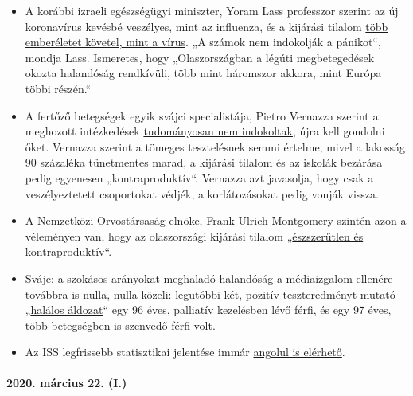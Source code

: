 \begin{itemize}
\tightlist
\item
  A korábbi izraeli egészségügyi miniszter, Yoram Lass professzor
  szerint az új koronavírus kevésbé veszélyes, mint az influenza, és a
  kijárási tilalom
  \href{https://en.globes.co.il/en/article-lockdown-lunacy-1001322696}{több
  emberéletet követel, mint a vírus}. „A számok nem indokolják a
  pánikot``, mondja Lass. Ismeretes, hogy „Olaszországban a légúti
  megbetegedések okozta halandóság rendkívüli, több mint háromszor
  akkora, mint Európa többi részén.``
\item
  A fertőző betegségek egyik svájci specialistája, Pietro Vernazza
  szerint a meghozott intézkedések
  \href{https://www.tagblatt.ch/leben/ostschweizer-infektiologe-pietro-vernazza-die-zahlen-zu-den-jungen-corona-virus-erkrankten-sind-irrefuehrend-ld.1206440}{tudományosan
  nem indokoltak}, újra kell gondolni őket. Vernazza szerint a tömeges
  tesztelésnek semmi értelme, mivel a lakosság 90 százaléka tünetmentes
  marad, a kijárási tilalom és az iskolák bezárása pedig egyenesen
  „kontraproduktív``. Vernazza azt javasolja, hogy csak a
  veszélyeztetett csoportokat védjék, a korlátozásokat pedig vonják
  vissza.
\item
  A Nemzetközi Orvostársaság elnöke, Frank Ulrich Montgomery szintén
  azon a véleményen van, hogy az olaszországi kijárási tilalom
  „\href{https://www.general-anzeiger-bonn.de/news/politik/deutschland/interview-mit-weltaerztepraesident-montgomery-ueber-corona-pandemie-ist-chaos_aid-49609561}{észszerűtlen
  és kontraproduktív}``.
\item
  Svájc: a szokásos arányokat meghaladó halandóság a médiaizgalom
  ellenére továbbra is nulla, nulla közeli: legutóbbi két, pozitív
  teszteredményt mutató
  „\href{https://www.bluewin.ch/de/newsregional/zuerich/1068-bestatigte-corona-falle-und-funf-todesfalle-im-kanton-zurich-371873.html}{halálos
  áldozat}`` egy 96 éves, palliatív kezelésben lévő férfi, és egy 97
  éves, több betegségben is szenvedő férfi volt.
\item
  Az ISS legfrissebb statisztikai jelentése immár
  \href{https://www.epicentro.iss.it/coronavirus/bollettino/Report-COVID-2019_20_marzo_eng.pdf}{angolul
  is elérhető}.
\end{itemize}

\hypertarget{2020-muxe1rcius-22-i}{%
\paragraph{2020. március 22. (I.)}\label{2020-muxe1rcius-22-i}}

